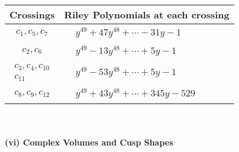 \documentclass[1p]{elsarticle_modified}
\theoremstyle{definition}
\begin{document}
\begin{tabular}{m{50pt}|m{274pt}}
Crossings & \hspace{64pt}Riley Polynomials at each crossing \\
\hline $$\begin{aligned}c_{1},c_{5},c_{7}\end{aligned}$$&$\begin{aligned}
&y^{49}+47 y^{48}+\cdots-31 y-1
\end{aligned}$\\
\hline $$\begin{aligned}c_{2},c_{6}\end{aligned}$$&$\begin{aligned}
&y^{49}-13 y^{48}+\cdots+5 y-1
\end{aligned}$\\
\hline $$\begin{aligned}c_{3},c_{4},c_{10}\\c_{11}\end{aligned}$$&$\begin{aligned}
&y^{49}-53 y^{48}+\cdots+5 y-1
\end{aligned}$\\
\hline $$\begin{aligned}c_{8},c_{9},c_{12}\end{aligned}$$&$\begin{aligned}
&y^{49}+43 y^{48}+\cdots+345 y-529
\end{aligned}$\\
\hline
\end{tabular}\\~\\
\newpage\flushleft \textbf{(vi) Complex Volumes and Cusp Shapes}
\end{document}
